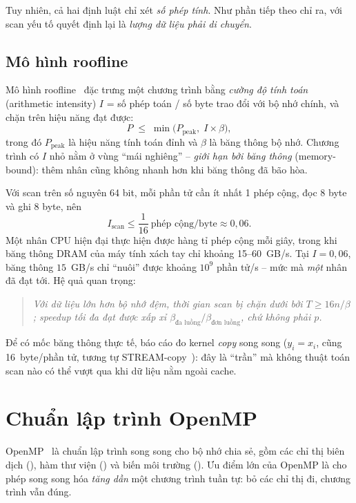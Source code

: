 Tuy nhiên, cả hai định luật chỉ xét \emph{số phép tính}. Như phần tiếp theo chỉ ra, với scan
yếu tố quyết định lại là \emph{lượng dữ liệu phải di chuyển}.

\subsection{Mô hình roofline}
\label{sec:roofline}

Mô hình roofline~\cite{williams2009} đặc trưng một chương trình bằng \emph{cường độ tính toán}
(arithmetic intensity) \(I\) = số phép toán / số byte trao đổi với bộ nhớ chính, và chặn trên
hiệu năng đạt được:
\begin{equation}
  P \;\le\; \min\bigl(P_{\text{peak}},\; I \times \beta\bigr),
  \label{eq:roofline}
\end{equation}
trong đó \(P_{\text{peak}}\) là hiệu năng tính toán đỉnh và \(\beta\) là băng thông bộ nhớ.
Chương trình có \(I\) nhỏ nằm ở vùng ``mái nghiêng'' -- \emph{giới hạn bởi băng thông}
(memory-bound): thêm nhân cũng không nhanh hơn khi băng thông đã bão hòa.

Với scan trên số nguyên 64 bit, mỗi phần tử cần ít nhất 1 phép cộng, đọc 8 byte và ghi 8 byte,
nên
\[
  I_{\text{scan}} \le \frac{1}{16}\ \text{phép cộng/byte} \approx 0{,}06.
\]
Một nhân CPU hiện đại thực hiện được hàng tỉ phép cộng mỗi giây, trong khi băng thông DRAM của
máy tính xách tay chỉ khoảng 15--60~GB/s. Tại \(I = 0{,}06\), băng thông \(15\)~GB/s chỉ ``nuôi''
được khoảng \(10^9\) phần tử/s -- mức mà \emph{một} nhân đã đạt tới. Hệ quả quan trọng:
\begin{quote}
\itshape Với dữ liệu lớn hơn bộ nhớ đệm, thời gian scan bị chặn dưới bởi
\(T \ge 16n/\beta\); speedup tối đa đạt được xấp xỉ \(\beta_{\text{đa luồng}}/\beta_{\text{đơn
luồng}}\), chứ không phải \(p\).
\end{quote}
Để có mốc băng thông thực tế, báo cáo đo kernel \emph{copy} song song (\(y_i = x_i\), cũng
16~byte/phần tử, tương tự STREAM-copy~\cite{mccalpin1995}): đây là ``trần'' mà không thuật toán
scan nào có thể vượt qua khi dữ liệu nằm ngoài cache.

\section{Chuẩn lập trình OpenMP}
\label{sec:openmp}

OpenMP~\cite{openmp52,chapman2008} là chuẩn lập trình song song cho bộ nhớ chia sẻ, gồm các chỉ
thị biên dịch (), hàm thư viện () và biến môi trường
(). Ưu điểm lớn của OpenMP là cho phép song song hóa \emph{tăng dần} một chương
trình tuần tự: bỏ các chỉ thị đi, chương trình vẫn đúng.

